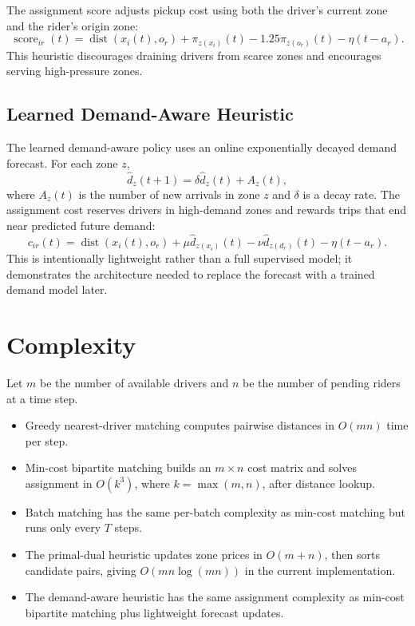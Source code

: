 \documentclass[11pt]{article}
\begin{document}
The assignment score adjusts pickup cost using both the driver's current zone and the rider's origin zone:
\[
\operatorname{score}_{ir}(t) =
\operatorname{dist}(x_i(t), o_r)
+ \pi_{z(x_i)}(t)
- 1.25\pi_{z(o_r)}(t)
- \eta(t-a_r).
\]
This heuristic discourages draining drivers from scarce zones and encourages serving high-pressure zones.

\subsection{Learned Demand-Aware Heuristic}

The learned demand-aware policy uses an online exponentially decayed demand forecast. For each zone \(z\),
\[
\hat{d}_z(t+1) = \delta \hat{d}_z(t) + A_z(t),
\]
where \(A_z(t)\) is the number of new arrivals in zone \(z\) and \(\delta\) is a decay rate. The assignment cost reserves drivers in high-demand zones and rewards trips that end near predicted future demand:
\[
c_{ir}(t) =
\operatorname{dist}(x_i(t), o_r)
+ \mu \hat{d}_{z(x_i)}(t)
- \nu \hat{d}_{z(d_r)}(t)
- \eta(t-a_r).
\]
This is intentionally lightweight rather than a full supervised model; it demonstrates the architecture needed to replace the forecast with a trained demand model later.

\section{Complexity}

Let \(m\) be the number of available drivers and \(n\) be the number of pending riders at a time step.

\begin{itemize}[nosep]
  \item Greedy nearest-driver matching computes pairwise distances in \(O(mn)\) time per step.
  \item Min-cost bipartite matching builds an \(m \times n\) cost matrix and solves assignment in \(O(k^3)\), where \(k=\max(m,n)\), after distance lookup.
  \item Batch matching has the same per-batch complexity as min-cost matching but runs only every \(T\) steps.
  \item The primal-dual heuristic updates zone prices in \(O(m+n)\), then sorts candidate pairs, giving \(O(mn\log(mn))\) in the current implementation.
  \item The demand-aware heuristic has the same assignment complexity as min-cost bipartite matching plus lightweight forecast updates.
\end{itemize}
\end{document}
